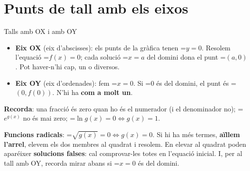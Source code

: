 \documentclass[11pt,a4paper]{article}
\newcommand{\fmm}[1]{\setbox0=\hbox{$#1$}\ifdim\wd0>\linewidth\[#1\]\else\mbox{\box0}\fi}
\newcommand{\fmuline}[1]{\textbf{\color{fmaccent}#1}}
\begin{document}
  
\section{Punts de tall amb els eixos}\hypertarget{sec2}{}

  

  
\begin{fmdef}{Talls amb OX i amb OY}
\begin{itemize}
\item \textbf{Eix OX} (eix d'abscisses): els punts de la gràfica tenen \fmm{y=0}. Resolem l'equació \fmm{f(x)=0}; cada solució \fmm{x=a} del domini dona el punt \fmm{(a,0)}. Pot haver-n'hi cap, un o diversos.
\item \textbf{Eix OY} (eix d'ordenades): fem \fmm{x=0}. Si \fmm{0} és del domini, el punt és \fmm{(0,f(0))}. N'hi ha \textbf{com a molt un}.
\end{itemize}

      
\begin{fmnote}\fmuline{Recorda}: una fracció és zero quan ho és el numerador (i el denominador no); \fmm{e^{g(x)}} no és mai zero; \fmm{\ln g(x)=0\Leftrightarrow g(x)=1}.\end{fmnote}

      
\begin{fmnote}\fmuline{Funcions radicals}: \fmm{\sqrt{g(x)}=0\Leftrightarrow g(x)=0}. Si hi ha més termes, \textbf{aïllem l'arrel}, elevem els dos membres al quadrat i resolem. En elevar al quadrat poden aparéixer \textbf{solucions falses}: cal comprovar-les totes en l'equació inicial. I, per al tall amb OY, recorda mirar abans si \fmm{x=0} és del domini.\end{fmnote}
\end{fmdef}
\end{document}
